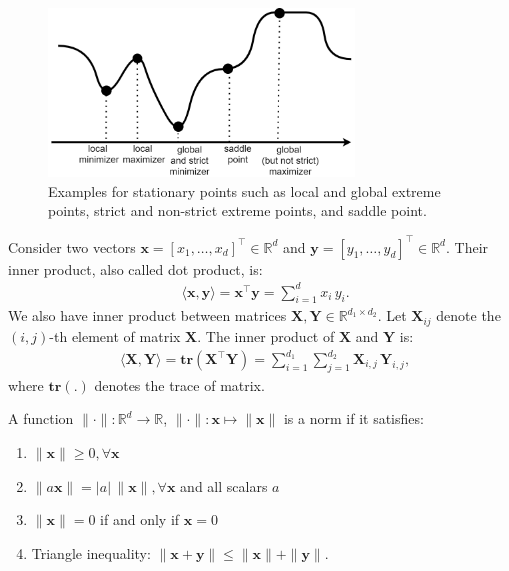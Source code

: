 \documentclass[lang=cn,10pt]{gorgeousnbook}
\numberwithin{equation}{section}%
\numberwithin{figure}{section}%
\begin{document}
\begin{figure}[!t]
  \centering
  \includegraphics[width=3.2in]{./images/StationaryPoints}
  \caption{Examples for stationary points such as local and global extreme points, strict and non-strict extreme points, and saddle point.}
  \label{figure_StationaryPoints}
\end{figure}

\begin{theorem}[内积]
  Consider two vectors $\boldsymbol{x} = [x_1, \dots, x_d]^\top \in \mathbb{R}^d$ and $\boldsymbol{y} = [y_1, \dots, y_d]^\top \in \mathbb{R}^d$. Their inner product, also called dot product, is:
  \begin{align*}
  & \langle \boldsymbol{x}, \boldsymbol{y} \rangle = \boldsymbol{x}^\top \boldsymbol{y} = \sum_{i=1}^d x_i\, y_i.
  \end{align*}
  We also have inner product between matrices $\boldsymbol{X}, \boldsymbol{Y} \in \mathbb{R}^{d_1 \times d_2}$. Let $\boldsymbol{X}_{ij}$ denote the $(i,j)$-th element of matrix $\boldsymbol{X}$. The inner product of $\boldsymbol{X}$ and $\boldsymbol{Y}$ is:
  \begin{align*}
  & \langle \boldsymbol{X}, \boldsymbol{Y} \rangle = \textbf{tr}(\boldsymbol{X}^\top \boldsymbol{Y}) = \sum_{i=1}^{d_1} \sum_{j=1}^{d_2} \boldsymbol{X}_{i,j}\, \boldsymbol{Y}_{i,j},
  \end{align*}
  where $\textbf{tr}(.)$ denotes the trace of matrix. 
\end{theorem}

\begin{definition}[范数]
  A function $\|\cdot\|: \mathbb{R}^d \rightarrow \mathbb{R}$, $\|\cdot\|: \boldsymbol{x} \mapsto \|\boldsymbol{x}\|$ is a norm if it satisfies:
\begin{enumerate}
  \item $\|\boldsymbol{x}\| \geq 0, \forall \boldsymbol{x}$
  \item $\|a \boldsymbol{x}\| = |a|\, \|\boldsymbol{x}\|, \forall \boldsymbol{x}$ and all scalars $a$
  \item $\|\boldsymbol{x}\| = 0$ if and only if $\boldsymbol{x} = 0$
  \item Triangle inequality: $\|\boldsymbol{x} + \boldsymbol{y}\| \leq \|\boldsymbol{x}\| + \|\boldsymbol{y}\|$.
\end{enumerate}
\end{definition}
\end{document}
